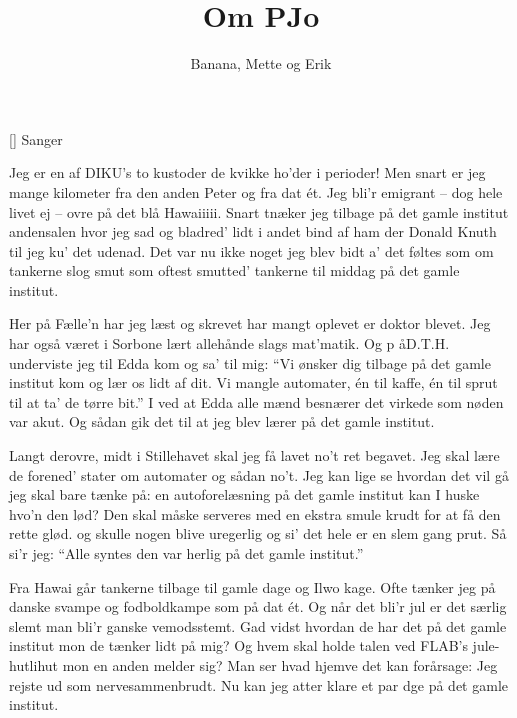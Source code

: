 \documentclass[a4paper,11pt]{article}
\title{Om PJo}
\author{Banana, Mette og Erik}
\begin{document}
\maketitle

\begin{roles}
[] Sanger
\end{roles}


\begin{song}
%
Jeg er en af DIKU's to kustoder
de kvikke ho'der
i perioder!
Men snart er jeg mange kilometer
fra den anden Peter
og fra dat ét.
Jeg bli'r emigrant
-- dog hele livet ej --
ovre på det blå Hawaiiiii.
Snart tnæker jeg tilbage på det gamle institut
andensalen hvor jeg sad
og bladred' lidt i andet bind af ham der Donald Knuth
til jeg ku' det udenad.
Det var nu ikke noget jeg blev bidt a'
det føltes som om tankerne slog smut
som oftest smutted' tankerne til middag
på det gamle institut.

Her på Fælle'n har jeg læst og skrevet
har mangt oplevet
er doktor blevet.
Jeg har også været i Sorbone
lært allehånde
slags mat'matik.
Og p åD.T.H.
underviste jeg
til Edda kom og sa' til mig:
``Vi ønsker dig tilbage på det gamle institut
kom og lær os lidt af dit.
Vi mangle automater, én til kaffe, én til sprut
til at ta' de tørre bit.''
I ved at Edda alle mænd besnærer
det virkede som nøden var akut.
Og sådan gik det til at jeg blev lærer
på det gamle institut.

Langt derovre, midt i Stillehavet
skal jeg få lavet
no't ret begavet.
Jeg skal lære de forened' stater
om automater
og sådan no't.
Jeg kan lige se
hvordan det vil gå
jeg skal bare tænke på:
en autoforelæsning på det gamle institut
kan I huske hvo'n den lød?
Den skal måske serveres med en ekstra smule krudt
for at få den rette glød.
og skulle nogen blive uregerlig
og si' det hele er en slem gang prut.
Så si'r jeg: ``Alle syntes den var herlig
på det gamle institut.''


Fra Hawai går tankerne tilbage
til gamle dage
og Ilwo kage.
Ofte tænker jeg på danske svampe
og fodboldkampe
som på dat ét.
Og når det bli'r jul
er det særlig slemt
man bli'r ganske vemodsstemt.
Gad vidst hvordan de har det på det gamle institut
mon de tænker lidt på mig?
Og hvem skal holde talen ved FLAB's jule-hutlihut
mon en anden melder sig?
Man ser hvad hjemve det kan forårsage:
Jeg rejste ud som nervesammenbrudt.
Nu kan jeg atter klare et par dge
på det gamle institut.
\end{song}
\end{document}
